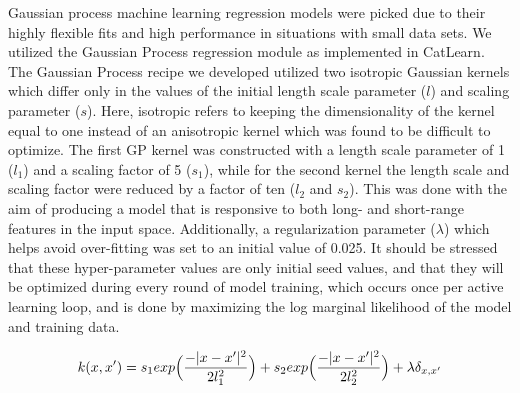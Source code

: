 %
%
Gaussian process machine learning regression models were picked due to their highly flexible fits and high performance in situations with small data sets.
%
We utilized the Gaussian Process regression module as implemented in CatLearn.\cite{hansen2019atomistic,CatLearn_Repo}
%
The Gaussian Process recipe we developed utilized two isotropic Gaussian kernels which differ only in the values of the initial length scale parameter ($l$) and scaling parameter ($s$).
%
Here, isotropic refers to keeping the dimensionality of the kernel equal to one instead of an anisotropic kernel which was found to be difficult to optimize.
%
The first GP kernel was constructed with a length scale parameter of \num{1} ($l_1$) and a scaling factor of 5 ($s_1$),
while for the second kernel the length scale and scaling factor were reduced by a factor of ten ($l_2$ and $s_2$).
%
This was done with the aim of producing a model that is responsive to both long- and short-range features in the input space.
%
Additionally, a regularization parameter ($\lambda$) which helps avoid over-fitting was set to an initial value of \num{0.025}.
%
It should be stressed that these hyper-parameter values are only initial seed values, and that they will be optimized during every round of model training,
which occurs once per active learning loop,
and is done by maximizing the log marginal likelihood of the model and training data.

\begin{equation}
    k(x,x') =
    s_1 exp \Bigl ( \frac{-|x-x'|^2}{2l_1^2}\Bigr) +
    s_2 exp\Bigl (\frac{-|x-x'|^2}{2l_2^2}\Bigr) +
    \lambda \delta_{x,x'}
\end{equation}









